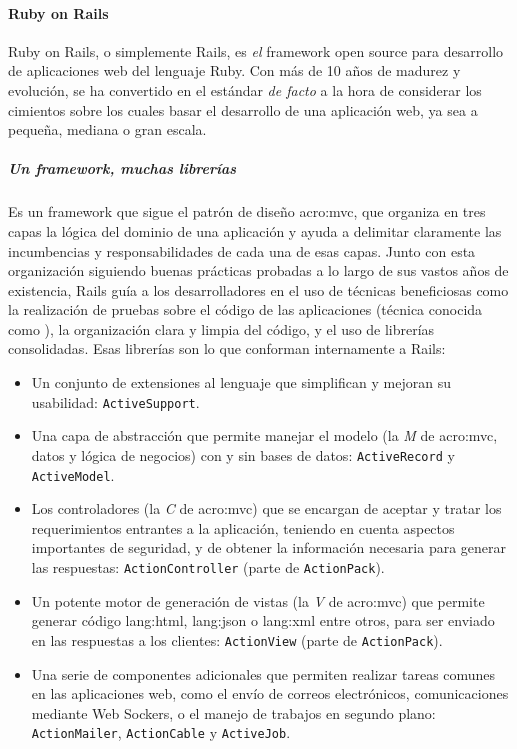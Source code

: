 \paragraph{Ruby on Rails}
\label{soa:tecnologias:rails}

Ruby on Rails, o simplemente Rails, es \textit{el} framework open source para desarrollo de aplicaciones web del lenguaje Ruby. Con más de 10 años de madurez y evolución, se ha convertido en el estándar \textit{de facto} a la hora de considerar los cimientos sobre los cuales basar el desarrollo de una aplicación web, ya sea a pequeña, mediana o gran escala.

\subparagraph{Un framework, muchas librerías}

Es un framework que sigue el patrón de diseño \gls{acro:mvc}, que organiza en tres capas la lógica del dominio de una aplicación y ayuda a delimitar claramente las incumbencias y responsabilidades de cada una de esas capas. Junto con esta organización siguiendo buenas prácticas probadas a lo largo de sus vastos años de existencia, Rails guía a los desarrolladores en el uso de técnicas beneficiosas como la realización de pruebas sobre el código de las aplicaciones (técnica conocida como ), la organización clara y limpia del código, y el uso de librerías consolidadas. Esas librerías son lo que conforman internamente a Rails:

\begin{itemize}
  \item Un conjunto de extensiones al lenguaje que simplifican y mejoran su usabilidad: \texttt{ActiveSupport}.
  \item Una capa de abstracción que permite manejar el modelo (la \textit{M} de \gls{acro:mvc}, datos y lógica de negocios) con y sin bases de datos: \texttt{ActiveRecord} y \texttt{ActiveModel}.
  \item Los controladores (la \textit{C} de \gls{acro:mvc}) que se encargan de aceptar y tratar los requerimientos entrantes a la aplicación, teniendo en cuenta aspectos importantes de seguridad, y de obtener la información necesaria para generar las respuestas: \texttt{ActionController} (parte de \texttt{ActionPack}).
  \item Un potente motor de generación de vistas (la \textit{V} de \gls{acro:mvc}) que permite generar código \gls{lang:html}, \gls{lang:json} o \gls{lang:xml} entre otros, para ser enviado en las respuestas a los clientes: \texttt{ActionView} (parte de \texttt{ActionPack}).
  \item Una serie de componentes adicionales que permiten realizar tareas comunes en las aplicaciones web, como el envío de correos electrónicos, comunicaciones mediante Web Sockers, o el manejo de trabajos en segundo plano: \texttt{ActionMailer}, \texttt{ActionCable} y \texttt{ActiveJob}.
\end{itemize}

